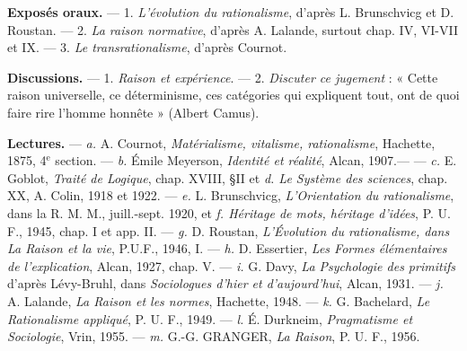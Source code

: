 {{\bf Exposés oraux.} — 1. {\it L'évolution du rationalisme}, d'après L. Brunschvicg
et D. Roustan. — 2. {\it La raison normative}, d'après A. Lalande, surtout
chap. IV, VI-VII et IX. — 3. {\it Le transrationalisme}, d'après Cournot.

{\bf Discussions.} — 1. {\it Raison et expérience}. — 2. {\it Discuter ce jugement} : « Cette
raison universelle, ce déterminisme, ces catégories qui expliquent tout, ont
de quoi faire rire l'homme honnête » (Albert Camus).

{\bf Lectures.} — {\it a.} A. Cournot, {\it Matérialisme, vitalisme, rationalisme}, Hachette,
1875, 4$^\text{e}$ section. — {\it b.} Émile Meyerson, {\it Identité et réalité}, Alcan, 1907.—
— {\it c.} E. Goblot, {\it Traité de Logique}, chap. XVIII, \S II et {\it d. Le Système des
sciences}, chap. XX, A. Colin, 1918 et 1922. — {\it e.} L. Brunschvicg, {\it L'Orientation du rationalisme}, dans la R. M. M., juill.-sept. 1920, et {\it f. Héritage
de mots, héritage d'idées}, P. U. F., 1945, chap. I et app. II. — {\it g.} D. Roustan, {\it L'Évolution du rationalisme, dans La Raison et la vie}, P.U.F., 1946, I.
— {\it h.} D. Essertier, {\it Les Formes élémentaires de l'explication}, Alcan, 1927,
chap. V. — {\it i.} G. Davy, {\it La Psychologie des primitifs} d'après Lévy-Bruhl,
dans {\it Sociologues d'hier et d'aujourd'hui}, Alcan, 1931. — {\it j.} A. Lalande,
{\it La Raison et les normes}, Hachette, 1948. — {\it k.} G. Bachelard, {\it Le Rationalisme
appliqué}, P. U. F., 1949. — {\it l.} É. Durkneim, {\it Pragmatisme et Sociologie},
Vrin, 1955. — {\it m.} G.-G. GRANGER, {\it La Raison}, P. U. F., 1956.
 }

